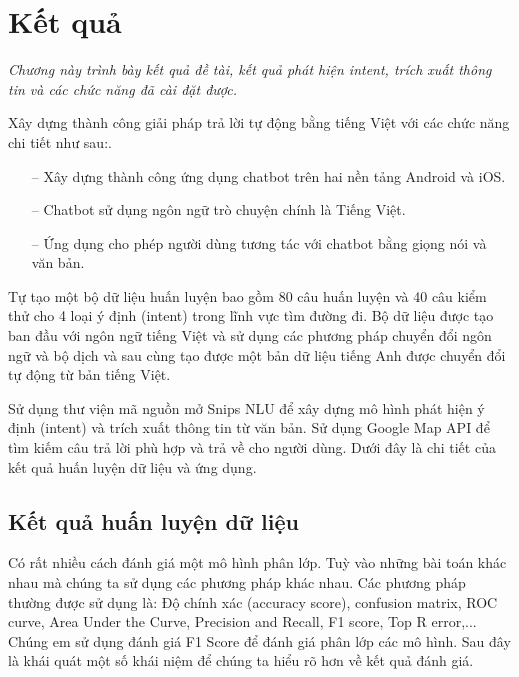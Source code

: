 \chapter{Kết quả}
\label{Chapter6}

\emph{Chương này trình bày kết quả đề tài, kết quả phát hiện intent, trích xuất thông tin và các chức năng đã cài đặt được.}


Xây dựng thành công giải pháp trả lời tự động bằng tiếng Việt với các chức năng chi tiết như sau:.
\begin{itemize}
    \item[--] Xây dựng thành công ứng dụng chatbot trên hai nền tảng Android và iOS.
    \item[--] Chatbot sử dụng ngôn ngữ trò chuyện chính là Tiếng Việt.
    \item[--] Ứng dụng cho phép người dùng tương tác với chatbot bằng giọng nói và văn bản.
\end{itemize}

Tự tạo một bộ dữ liệu huấn luyện bao gồm 80 câu huấn luyện và 40 câu kiểm thử cho 4 loại ý định (intent) trong lĩnh vực tìm đường đi. Bộ dữ liệu được tạo ban đầu với ngôn ngữ tiếng Việt và sử dụng các phương pháp chuyển đổi ngôn ngữ và bộ dịch và sau cùng tạo được một bản dữ liệu tiếng Anh được chuyển đổi tự động từ bản tiếng Việt.  

Sử dụng thư viện mã nguồn mở Snips NLU\cite{Snipsnlu} để xây dựng mô hình phát hiện ý định (intent) và trích xuất thông tin từ văn bản. Sử dụng Google Map API\cite{ggmaps} để tìm kiếm câu trả lời phù hợp và trả về cho người dùng. Dưới đây là chi tiết của kết quả huấn luyện dữ liệu và ứng dụng.

\section{Kết quả huấn luyện dữ liệu}

Có rất nhiều cách đánh giá một mô hình phân lớp. Tuỳ vào những bài toán khác nhau mà chúng ta sử dụng các phương pháp khác nhau. Các phương pháp thường được sử dụng là: Độ chính xác (accuracy score), confusion matrix, ROC curve, Area Under the Curve, Precision and Recall, F1 score, Top R error,... Chúng em sử dụng đánh giá F1 Score để đánh giá phân lớp các mô hình. Sau đây là khái quát một số khái niệm để chúng ta hiểu rõ hơn về kết quả đánh giá.


